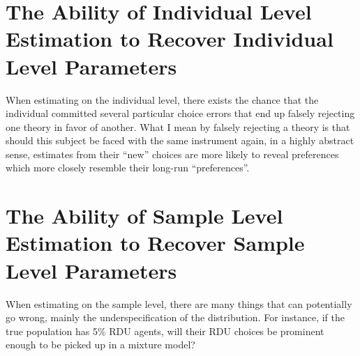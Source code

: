 \documentclass[../main.tex]{subfiles}
\begin{document}
\section{The Ability of Individual Level Estimation to Recover Individual Level Parameters}

When estimating on the individual level, there exists the chance that the individual committed several particular choice errors that end up falsely rejecting one theory in favor of another.
What I mean by falsely rejecting a theory is that should this subject be faced with the same instrument again, in a highly abstract sense, estimates from their \enquote{new} choices are more likely to reveal preferences which more closely resemble their long-run \enquote{preferences}.

\section{The Ability of Sample Level Estimation to Recover Sample Level Parameters}

When estimating on the sample level, there are many things that can potentially go wrong, mainly the underspecification of the distribution.
For instance, if the true population has 5\% RDU agents, will their RDU choices be prominent enough to be picked up in a mixture model?

\newpage

\printbibliography[segment=4, heading=subbibliography]
\end{document}
